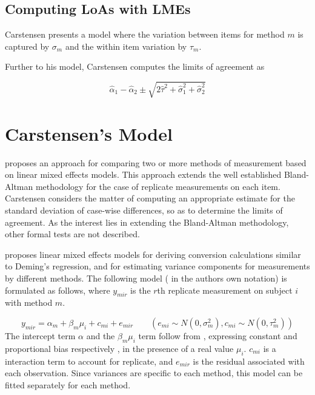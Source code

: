 \documentclass{report}
\begin{document}
	\subsection{Computing LoAs with LMEs}
	
	
	Carstensen presents a model where the variation between items for
	method $m$ is captured by $\sigma_m$ and the within item variation
	by $\tau_m$.
	
	Further to his model, Carstensen computes the limits of agreement
	as
	
	\[
	\hat{\alpha}_1 - \hat{\alpha}_2 \pm \sqrt{2 \hat{\tau}^2 +
		\hat{\sigma}^2_1 + \hat{\sigma}^2_2}
	\]
	
	
	
	
	\section{Carstensen's Model}
	\citet{BXC2008} proposes an approach for comparing two or more methods of measurement based on linear mixed effects models. This approach extends the well established Bland-Altman methodology for the case of replicate measurements on each item. Carstensen considers the matter of computing an appropriate estimate for the standard deviation of case-wise differences, so as to determine the limits of agreement. As the interest lies in extending the Bland-Altman methodology, other formal tests are not described.
	
	\citet{BXC2004} proposes linear mixed effects models for deriving
	conversion calculations similar to Deming's regression, and for
	estimating variance components for measurements by different
	methods. The following model ( in the authors own notation) is
	formulated as follows, where $y_{mir}$ is the $r$th replicate
	measurement on subject $i$ with method $m$.
	
	\begin{equation}
	y_{mir}  = \alpha_{m} + \beta_{m}\mu_{i} + c_{mi} + e_{mir} \qquad
	( e_{mi} \sim N(0,\sigma^{2}_{m}), c_{mi} \sim N(0,\tau^{2}_{m}))
	\end{equation}
	The intercept term $\alpha$ and the $\beta_{m}\mu_{i}$ term follow
	from \citet{DunnSEME}, expressing constant and proportional bias
	respectively , in the presence of a real value $\mu_{i}.$
	$c_{mi}$ is a interaction term to account for replicate, and
	$e_{mir}$ is the residual associated with each observation.
	Since variances are specific to each method, this model can be
	fitted separately for each method.
	
\end{document}
